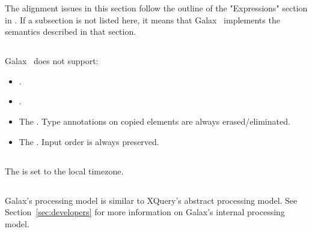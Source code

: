 The alignment issues in this section follow the outline of the
"Expressions" section in .  If
a subsection is not listed here, it means that Galax \galaxversion\
implements the semantics described in that section.

\subsection*{}

   Galax \galaxversion\ does not support:
\begin{itemize}
\item {}.
\item {}.
\item The .  Type annotations on copied
  elements are always erased/eliminated. 
\item The .  Input order is always preserved. 
\end{itemize}

\subsection*{}
The \term{implicit timezone} is set to the local timezone. 

\subsection*{}

Galax's processing model is similar to XQuery's abstract processing
model.  See Section~\ref{sec:developers} for more information on
Galax's internal processing model.

\subsection*{}

\subsection*{}

